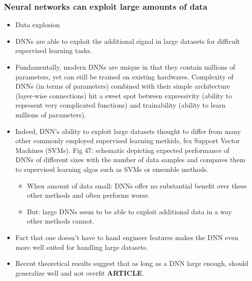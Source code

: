\documentclass[norsk,a4paper,11pt]{article}
\begin{document}
\subsubsection{Neural networks can exploit large amounts of data}
\begin{itemize}
	\item Data explosion
	\item DNNs are able to exploit the additional signal in large datasets for difficult supervised learning tasks.
	\item Fundamentally, modern DNNs are unique in that they contain millions of parameters, yet can still be trained on existing hardwares. Complexity of DNNs (in terms of parameters) combined with their simple architecture (layer-wise connections) hit a sweet spot between expressivity (ability to represent very complicated functions) and trainability (ability to learn millions of parameters).
	\item Indeed, DNN's ability to exploit large datasets thought to differ from many other commonly employed supervised learning methids, fex Support Vector Machines (SVMs). Fig 47: schematic depicting expected performance of DNNs of different sizes with the number of data samples and compares them to supervised learning algos such as SVMs or ensemble methods.
	\begin{itemize}
		\item When amount of data small: DNNs offer no substantial benefit over these other methods and often performs worse.
		\item But: large DNNs seem to be able to exploit additional data in a way other methods cannot. 
	\end{itemize}
	\item Fact that one doesn't have to hand engineer features makes the DNN even more well suited for handling large datasets. 
	\item Recent theoretical results suggest that as long as a DNN large enough, should generalize well and not overfit \textbf{ARTICLE}.
\end{itemize}
\end{document}
